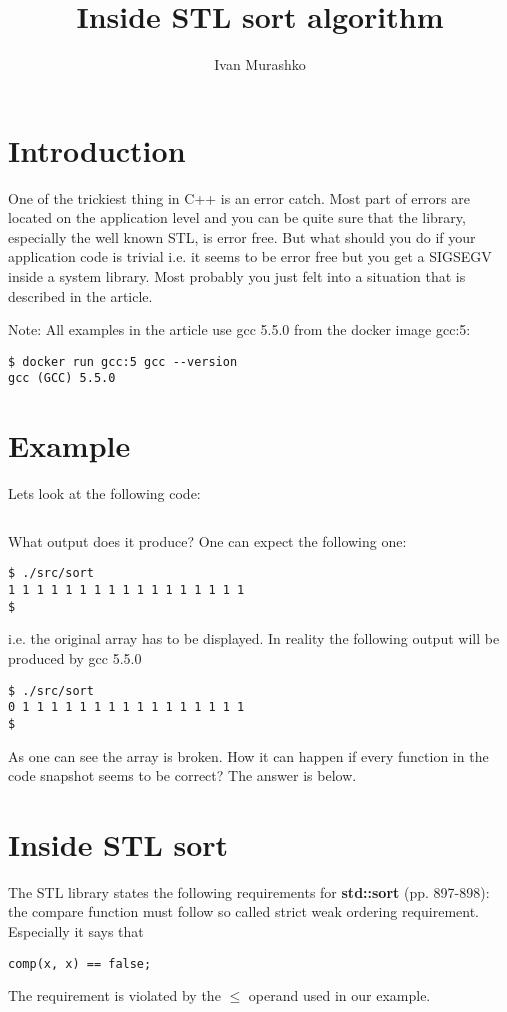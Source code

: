 \documentclass[14pt,a4paper]{article}
\title{Inside STL sort algorithm}
\author{Ivan Murashko}
\date{}
\begin{document}
\maketitle

\section*{Introduction}
One of the trickiest thing in C++ is an error catch. Most part of errors
are located on the application level and you can be quite sure that
the library, especially the well known STL, is error free. But what
should you do if your application code is trivial i.e. it seems to be
error free but you get a SIGSEGV inside a system library. Most
probably you just felt into a situation that is described in the
article. 

Note: All examples in the article use gcc 5.5.0 from the docker image
gcc:5: 
\begin{verbatim}
$ docker run gcc:5 gcc --version
gcc (GCC) 5.5.0
\end{verbatim}


\section{Example}
Lets look at the following code:
\inputminted{c++}{./src/sort.cpp}
What output does it produce? One can expect the following one:
\begin{verbatim}
$ ./src/sort
1 1 1 1 1 1 1 1 1 1 1 1 1 1 1 1 1
$
\end{verbatim}
i.e. the original array has to be displayed. In reality the following
output will be produced by gcc 5.5.0 
\begin{verbatim}
$ ./src/sort
0 1 1 1 1 1 1 1 1 1 1 1 1 1 1 1 1
$
\end{verbatim}
As one can see the array is broken. How it can happen if every
function in the code snapshot seems to be correct? The answer is
below. 

\section{Inside STL sort}

The STL library states the following requirements for \textbf{std::sort} 
\cite{ISO:2013:IIP}(pp. 897-898): the compare function must follow so
called strict weak ordering requirement. Especially it
says that 
\begin{verbatim}
comp(x, x) == false;
\end{verbatim}
The requirement is violated
by the $\le$ operand used in our example.  
\end{document}

